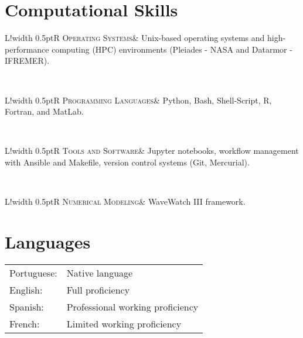 \documentclass[10pt]{article}
\newcommand\VRule{\color{lightgray}\vrule width 0.5pt}
\begin{document}
\section*{Computational Skills}
\vspace{.3cm}
\begin{tabular}{L!{\VRule}R}
\textsc{Operating Systems}& Unix-based 
	operating systems and high-performance computing (HPC) environments (Pleiades - NASA and Datarmor - IFREMER). \\
\end{tabular}
\\[5pt]
\begin{tabular}{L!{\VRule}R}
\textsc{Programming Languages}& Python, Bash, Shell-Script, R, Fortran, and MatLab.
\end{tabular}
\\[5pt]
\begin{tabular}{L!{\VRule}R}
\textsc{Tools and Software}&  Jupyter notebooks, workflow management with Ansible and Makefile, version control systems (Git, Mercurial).
\end{tabular}
\\[5pt]
\begin{tabular}{L!{\VRule}R}
\textsc{Numerical Modeling}& WaveWatch III framework.
\end{tabular}

\vspace{.5cm}
\section*{Languages}
\vspace{.3cm}
\begin{tabular}{l l}
Portuguese: & Native language\\[3pt]
English:& Full proficiency\\[3pt] 
Spanish: & Professional working proficiency \\[3pt]
French:& Limited working proficiency \\
\end{tabular}
\vspace{.5cm}

\vspace{.3cm}
\end{document}
